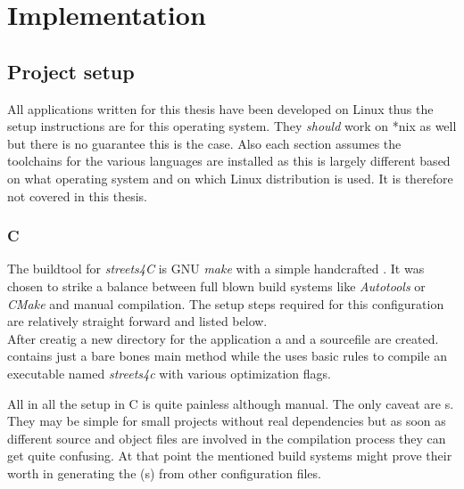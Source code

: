 \chapter{Implementation}
\label{ch:Implementation}


\setcounter{section}{-1}
\section{Project setup}
\label{sec:Implementation::Setup}

All applications written for this thesis have been developed on Linux thus the setup instructions are for this operating system. They \textit{should} work on *nix as well but there is no guarantee this is the case. Also each section assumes the toolchains for the various languages are installed as this is largely different based on what operating system and on which Linux distribution is used. It is therefore not covered in this thesis.

\subsection{C}
\label{subsec:Implementation::Setup::C}

The buildtool for \textit{streets4C} is GNU \textit{make} with a simple handcrafted . It was chosen to strike a balance between full blown build systems like \textit{Autotools} or \textit{CMake} and manual compilation. The setup steps required for this configuration are relatively straight forward and listed below.
\\


After creatig a new directory for the application a  and a sourcefile are created.  contains just a bare bones main method while the  uses basic rules to compile an executable named \textit{streets4c} with various optimization flags.

All in all the setup in C is quite painless although manual. The only caveat are s. They may be simple for small projects without real dependencies but as soon as different source and object files are involved in the compilation process they can get quite confusing. At that point the mentioned build systems might prove their worth in generating the (s) from other configuration files.

